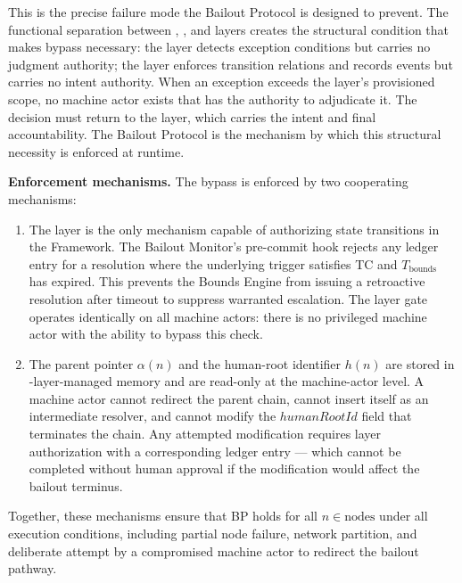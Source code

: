 This is the precise failure mode the Bailout Protocol is designed to prevent. The functional separation between \purpose{}, \bounds{}, and \fact{} layers creates the structural condition that makes bypass necessary: the \bounds{} layer detects exception conditions but carries no judgment authority; the \fact{} layer enforces transition relations and records events but carries no intent authority. When an exception exceeds the \bounds{} layer's provisioned scope, no machine actor exists that has the authority to adjudicate it. The decision must return to the \purpose{} layer, which carries the intent and final accountability. The Bailout Protocol is the mechanism by which this structural necessity is enforced at runtime.

\bigskip
\noindent\textbf{Enforcement mechanisms.} The bypass is enforced by two cooperating mechanisms:

\begin{enumerate}
\item[\textbf{Fact Layer gate.}] The \fact{} layer is the only mechanism capable of authorizing state transitions in the \bxthree{} Framework. The Bailout Monitor's pre-commit hook rejects any ledger entry for a resolution where the underlying trigger satisfies TC and $T_{\text{bounds}}$ has expired. This prevents the Bounds Engine from issuing a retroactive resolution after timeout to suppress warranted escalation. The \fact{} layer gate operates identically on all machine actors: there is no privileged machine actor with the ability to bypass this check.

\item[\textbf{Immutable parent-pointer and human-root architecture.}] The parent pointer $\alpha(n)$ and the human-root identifier $h(n)$ are stored in \fact-layer-managed memory and are read-only at the machine-actor level. A machine actor cannot redirect the parent chain, cannot insert itself as an intermediate resolver, and cannot modify the $humanRootId$ field that terminates the chain. Any attempted modification requires \purpose{} layer authorization with a corresponding ledger entry --- which cannot be completed without human approval if the modification would affect the bailout terminus.
\end{enumerate}

Together, these mechanisms ensure that BP holds for all $n \in \text{nodes}$ under all execution conditions, including partial node failure, network partition, and deliberate attempt by a compromised machine actor to redirect the bailout pathway.

